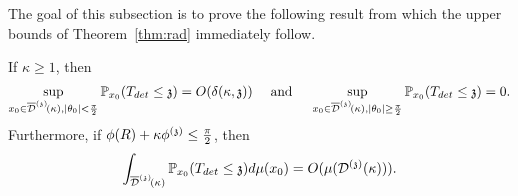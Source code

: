 The goal of this subsection is to prove the following result from which 
the upper bounds of Theorem~\ref{thm:rad} immediately follow.
\begin{proposition}\label{prop:rad-lowerBnd}
If  $\kappa\geq 1$, then
\[
\sup_{x_0 \in \overline{\mathcal{D}}^{(\mathfrak{z})}\!(\kappa), |\theta_0| < \frac{\pi}{2}}  \mathbb{P}_{x_0}(T_{det}\leq\mathfrak{z})=O(\delta(\kappa,\mathfrak{z})) 
\quad\text{ and } \quad 
\sup_{x_0 \in \overline{\mathcal{D}}^{(\mathfrak{z})}\!(\kappa), |\theta_0| \geq \frac{\pi}{2}}  \mathbb{P}_{x_0}(T_{det}\leq\mathfrak{z})=0. 
\]
Furthermore, if $\phi(R)+\kappa\phi^{(\mathfrak{z})}\leq\frac{\pi}{2}$, then
\[
\int_{\overline{\mathcal{D}}^{(\mathfrak{z})}\!(\kappa)}\mathbb{P}_{x_0}(T_{det}\leq\mathfrak{z})d\mu(x_0) = O(\mu(\mathcal{D}^{(\mathfrak{z})}(\kappa))).
\]
\end{proposition}
